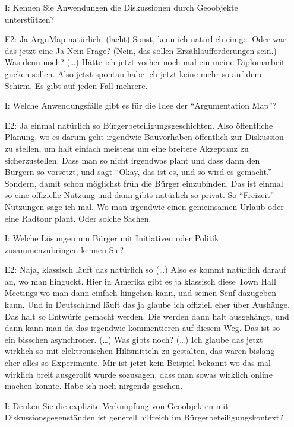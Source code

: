 \begin{itemize}
    \item[I:] Kennen Sie Anwendungen die Diskussionen durch Geoobjekte unterst{\"u}tzen?
    \item[E2:] Ja ArguMap nat{\"u}rlich. (lacht) Sonst, kenn ich nat{\"u}rlich einige. Oder war das jetzt eine Ja-Nein-Frage? (Nein, das sollen Erz{\"a}hlaufforderungen sein.) Was denn noch? (\dots) H{\"a}tte ich jetzt vorher noch mal ein meine Diplomarbeit gucken sollen. Also jetzt spontan habe ich jetzt keine mehr so auf dem Schirm. Es gibt auf jeden Fall mehrere.
    \item[I:] Welche Anwendungsf{\"a}lle gibt es f{\"u}r die Idee der "`Argumentation Map"'?
    \item[E2:] Ja einmal nat{\"u}rlich so B{\"u}rgerbeteiligungsgeschichten. Also {\"o}ffentliche Planung, wo es darum geht irgendwie Bauvorhaben {\"o}ffentlich zur Diskussion zu stellen, um halt einfach meistens um eine breitere Akzeptanz zu sicherzustellen. Dass man so nicht irgendwas plant und dass dann den B{\"u}rgern so vorsetzt, und sagt "`Okay, das ist es, und so wird es gemacht."' Sondern, damit schon m{\"o}glichst fr{\"u}h die B{\"u}rger einzubinden. Das ist einmal so eine offizielle Nutzung und dann gibts nat{\"u}rlich so privat. So "`Freizeit"'-Nutzungen sage ich mal. Wo man irgendwie einen gemeinsamen Urlaub oder eine Radtour plant. Oder solche Sachen.
    \item[I:] Welche L{\"o}sungen um B{\"u}rger mit Initiativen oder Politik zusammenzubringen kennen Sie?
    \item[E2:] Naja, klassisch l{\"a}uft das nat{\"u}rlich so (\dots) Also es kommt nat{\"u}rlich darauf an, wo man hinguckt. Hier in Amerika gibt es ja klassisch diese Town Hall Meetings wo man dann einfach hingehen kann, und seinen Senf dazugeben kann. Und in Deutschland l{\"a}uft das ja glaube ich offiziell eher {\"u}ber Aush{\"a}nge. Das halt so Entw{\"u}rfe gemacht werden. Die werden dann halt ausgeh{\"a}ngt, und dann kann man da das irgendwie kommentieren auf diesem Weg. Das ist so ein bisschen asynchroner. (\dots) Was gibts noch? (\dots) Ich glaube das jetzt wirklich so mit elektronischen Hilfsmitteln zu gestalten, das waren bislang eher alles so Experimente. Mir ist jetzt kein Beispiel bekannt wo das mal wirklich breit ausgerollt wurde sozusagen, dass man sowas wirklich online machen konnte. Habe ich noch nirgends gesehen.
    \item[I:] Denken Sie die explizite Verkn{\"u}pfung von Geoobjekten mit Diskussionsgegenst{\"a}nden ist generell hilfreich im B{\"u}rgerbeteiligungskontext?

\end{itemize}
